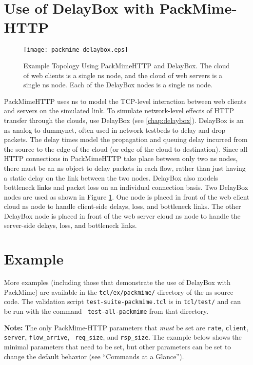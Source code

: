 \section{Use of DelayBox with PackMime-HTTP}
\label{sec:pm-db}

\begin{figure}
\centering
\texttt{[image: packmime-delaybox.eps]}
\label{fig-pmdb}
\caption{Example Topology Using PackMimeHTTP and DelayBox. The cloud
  of web clients is a single ns node, and the cloud of web servers is
  a single ns node. Each of the DelayBox nodes is a single ns node.} 
\end{figure}  

PackMimeHTTP uses ns to model the TCP-level interaction between web
clients and servers on the simulated link. To simulate network-level
effects of HTTP transfer through the clouds, use DelayBox (see
\ref{chap:delaybox}). DelayBox is an ns analog to dummynet, often used
in network testbeds to delay and drop packets. The delay times model
the propagation and queuing delay incurred from the source to the edge
of the cloud (or edge of the cloud to destination). Since all HTTP
connections in PackMimeHTTP take place between only two ns nodes,
there must be an ns object to delay packets in each flow, rather
than just having a static delay on the link between the two
nodes. DelayBox also models bottleneck links and packet loss on an
individual connection basis. Two DelayBox nodes are used as shown in
Figure \ref{fig-pmdb}. One node is placed in front of the web client
cloud ns node to handle client-side delays, loss, and bottleneck
links. The other DelayBox node is placed in front of the web server
cloud ns node to handle the server-side delays, loss, and bottleneck
links.

\section{Example}
More examples (including those that demonstrate the use of DelayBox
with PackMime) are available in the {\tt tcl/ex/packmime/} directory of the
ns source code.  The validation script {\tt test-suite-packmime.tcl}
is in {\tt tcl/test/} and can be run with the command {\tt
test-all-packmime} from that directory.

\textbf{Note:}  The only PackMime-HTTP parameters that \emph{must} be set are
       {\tt rate}, {\tt client}, {\tt server}, {\tt flow\_arrive}, {\tt
       req\_size}, and {\tt rsp\_size}.  The example below shows the
       minimal parameters that need to be set, but other parameters
       can be set to change the default behavior (see ``Commands at a
       Glance'').  

